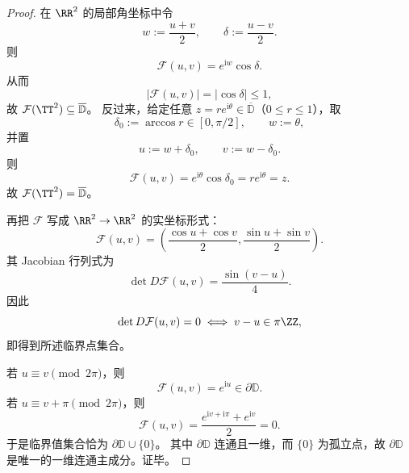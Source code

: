 \begin{proof}
在 \(\RR^2\) 的局部角坐标中令
\[
w:=\frac{u+v}{2},
\qquad
\delta:=\frac{u-v}{2}.
\]
则
\[
\mathcal F(u,v)=e^{\mathrm{i}w}\cos\delta.
\]
从而
\[
|\mathcal F(u,v)|=|\cos\delta|\le 1,
\]
故 \(\mathcal F(\TT^2)\subseteq\overline{\mathbb D}\)。
反过来，给定任意 \(z=re^{\mathrm{i}\theta}\in\overline{\mathbb D}\)（\(0\le r\le 1\)），取
\[
\delta_0:=\arccos r\in[0,\pi/2],
\qquad
w:=\theta,
\]
并置
\[
u:=w+\delta_0,
\qquad
v:=w-\delta_0.
\]
则
\[
\mathcal F(u,v)=e^{\mathrm{i}\theta}\cos\delta_0=re^{\mathrm{i}\theta}=z.
\]
故 \(\mathcal F(\TT^2)=\overline{\mathbb D}\)。

再把 \(\mathcal F\) 写成 \(\RR^2\to\RR^2\) 的实坐标形式：
\[
\mathcal F(u,v)
=
\left(
\frac{\cos u+\cos v}{2},
\frac{\sin u+\sin v}{2}
\right).
\]
其 Jacobian 行列式为
\[
\det D\mathcal F(u,v)
=
\frac{\sin(v-u)}{4}.
\]
因此
\[
\det D\mathcal F(u,v)=0
\iff
v-u\in\pi\ZZ,
\]
即得到所述临界点集合。

若 \(u\equiv v\pmod{2\pi}\)，则
\[
\mathcal F(u,v)=e^{\mathrm{i}u}\in\partial\mathbb D.
\]
若 \(u\equiv v+\pi\pmod{2\pi}\)，则
\[
\mathcal F(u,v)=\frac{e^{\mathrm{i}v+\mathrm{i}\pi}+e^{\mathrm{i}v}}{2}=0.
\]
于是临界值集合恰为 \(\partial\mathbb D\cup\{0\}\)。
其中 \(\partial\mathbb D\) 连通且一维，而 \(\{0\}\) 为孤立点，故 \(\partial\mathbb D\) 是唯一的一维连通主成分。证毕。
\end{proof}

